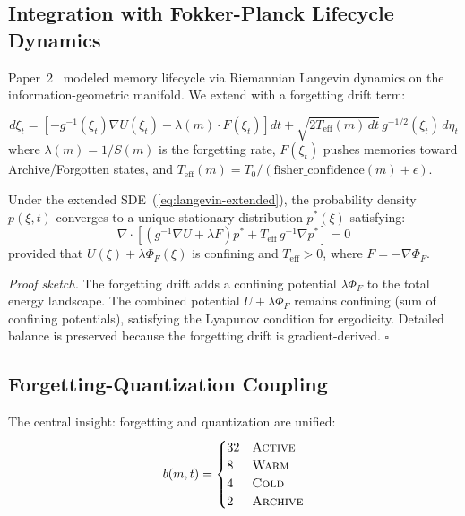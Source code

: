 \subsection{Integration with Fokker-Planck Lifecycle Dynamics}

Paper~2~\cite{slm-paper2} modeled memory lifecycle via Riemannian Langevin dynamics on the information-geometric manifold. We extend with a forgetting drift term:

\begin{equation}
d\xi_t = \left[-g^{-1}(\xi_t) \nabla U(\xi_t) - \lambda(m) \cdot F(\xi_t)\right] dt + \sqrt{2T_{\text{eff}}(m) \, dt} \, g^{-1/2}(\xi_t) \, d\eta_t
\label{eq:langevin-extended}
\end{equation}
where $\lambda(m) = 1/S(m)$ is the forgetting rate, $F(\xi_t)$ pushes memories toward Archive/Forgotten states, and $T_{\text{eff}}(m) = T_0 / (\text{fisher\_confidence}(m) + \epsilon)$.

\begin{theorem}
\label{thm:convergence}
Under the extended SDE~(\ref{eq:langevin-extended}), the probability density $p(\xi, t)$ converges to a unique stationary distribution $p^*(\xi)$ satisfying:
\begin{equation}
\nabla \cdot \left[\left(g^{-1} \nabla U + \lambda F\right) p^* + T_{\text{eff}} \, g^{-1} \nabla p^*\right] = 0
\end{equation}
provided that $U(\xi) + \lambda \Phi_F(\xi)$ is confining and $T_{\text{eff}} > 0$, where $F = -\nabla \Phi_F$.
\end{theorem}

\textit{Proof sketch.} The forgetting drift adds a confining potential $\lambda \Phi_F$ to the total energy landscape. The combined potential $U + \lambda \Phi_F$ remains confining (sum of confining potentials), satisfying the Lyapunov condition for ergodicity. Detailed balance is preserved because the forgetting drift is gradient-derived. $\square$

\subsection{Forgetting-Quantization Coupling}

The central insight: forgetting and quantization are unified:
\begin{equation}
b(m, t) = \begin{cases}
32 & \textsc{Active} \\
8 & \textsc{Warm} \\
4 & \textsc{Cold} \\
2 & \textsc{Archive}
\end{cases}
\end{equation}

